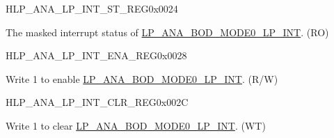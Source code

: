 \begin{register}{H}{LP\_ANA\_LP\_INT\_ST\_REG}{0x0024}\label{regdesc:LPANALPINTSTREG}%
%
\regnewline%
\begin{regdesc}\begin{reglist}
\label{fielddesc:LPANABODMODE0LPINTST}\item [LP\_ANA\_BOD\_MODE0\_LP\_INT\_ST] The masked interrupt status of \hyperref[int:LPANABODMODE0LPINT]{LP\_ANA\_BOD\_MODE0\_LP\_INT}. (RO)
\end{reglist}\end{regdesc}
\end{register}

\begin{register}{H}{LP\_ANA\_LP\_INT\_ENA\_REG}{0x0028}\label{regdesc:LPANALPINTENAREG}
%
%
\regnewline%
\begin{regdesc}\begin{reglist}
\label{fielddesc:LPANABODMODE0LPINTENA}\item [LP\_ANA\_BOD\_MODE0\_LP\_INT\_ENA] Write 1 to enable \hyperref[int:LPANABODMODE0LPINT]{LP\_ANA\_BOD\_MODE0\_LP\_INT}. (R/W)
\end{reglist}\end{regdesc}
\end{register}

\begin{register}{H}{LP\_ANA\_LP\_INT\_CLR\_REG}{0x002C}\label{regdesc:LPANALPINTCLRREG}
%
%
\regnewline%
\begin{regdesc}\begin{reglist}
\label{fielddesc:LPANABODMODE0LPINTCLR}\item [LP\_ANA\_BOD\_MODE0\_LP\_INT\_CLR] Write 1 to clear \hyperref[int:LPANABODMODE0LPINT]{LP\_ANA\_BOD\_MODE0\_LP\_INT}. (WT)
\end{reglist}\end{regdesc}
\end{register}

